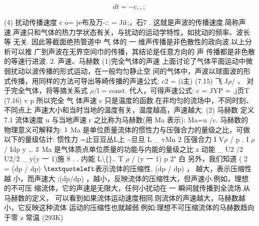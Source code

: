 \[dt = -c,, ;\]

(4) 扰动传播速度 c o= j${\rm e}$布及万-:: = Ji${\rm i}$;，石7 . 这就是声波的传播速度.简称声 速.声速只和气体的热力学状态有关，与扰动的运动学特性，如扰动的频率、波长等 无关. 因此等截面绝热管道中 气 体的 一 维声传播是非色散性的政向波.以上分析可以推 广到声波在无界空间巾的传播，其结论是任意方向的 声 传播都是非色散的等速行进波. 2. 声速、马赫数 (1)完全气体的声速 上面讨论了气体平面运动中微弱扰动以波传播的形式运动，在一般均匀静止空 间的气体中，声波以球面波的形式传播，用同样的方法可导出等崎传播的声速公式: c2 = (i主) (7.15) 飞 J$\rho$/ 、 对于完全气体，将等摘关系式 $\rho$/l = const. 代人，可得声速公式: c = JYP = .j页T (7.16) v p 所以完全 气 体声速 c 只是温度的函数.在非均匀的流场中，不同时刻、不同点上 声速大小和当时当地的温度有关，温度越高，声速越大. (2) 马赫数 定义 7.1 流体速度 u 与当地声速 r 之比称为马赫数(用 Ma 表示): Ma=u /c. 马赫数的物理意义可解释为: ${\rm 1}$ Ma 是单位质量流体的惯性力与压强合力的量级之比，可做以下的量级估计: 惯性力 =止豆豆丛L上 \textasciitilde{}旦旦 L \_ vMn 2 压强合力 I V$\rho$ / p . I $\rho$ / Idp y … ${\rm 2}$ Ma 是气体质点单位质量的功能与内能的量级之比 z 动能 \_ U2 /2 U2/2 \_ y(y 一 1)施 8 . . 内能 L\textbackslash\{\}.. T $\rho$ / (y 一 1) p 2" 白 另外，我们知道 ( 2 = (dp / dp) ${\rm ‘}$表示流体的压缩性. (dp / dp) ， 越大，表示压缩性越 小，而声速大 ;(dp/dp) ，越小，反映流体的压缩性大，但声速小.例如，理想的不可压 缩流体，它的声速是无限大，任何小扰动在 一 瞬间就传播到全流场.从马赫数的定义， 可以看到如果流体运动速度相同.则流体的声速越大，马赫数越小，它反映这种流体 运动的压缩性也就越弱.例如:理想不可压缩流体的马赫数趋向于零 z 常温 (293K)

